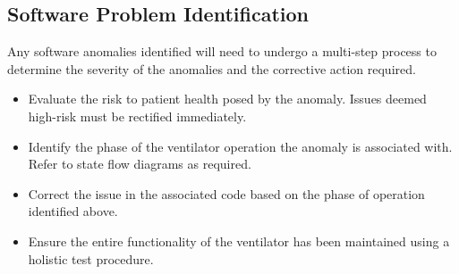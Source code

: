 \documentclass[]{article}
\begin{document}
\subsection{Software Problem Identification}
Any software anomalies identified will need to undergo a multi-step process to determine the severity of the anomalies and the corrective action required.

\begin{itemize}
	\item Evaluate the risk to patient health posed by the anomaly.  Issues deemed high-risk must be rectified immediately.
	\item Identify the phase of the ventilator operation the anomaly is associated with.  Refer to state flow diagrams as required.
	\item Correct the issue in the associated code based on the phase of operation identified above.
	\item Ensure the entire functionality of the ventilator has been maintained using a holistic test procedure.
\end{itemize}
\end{document}
